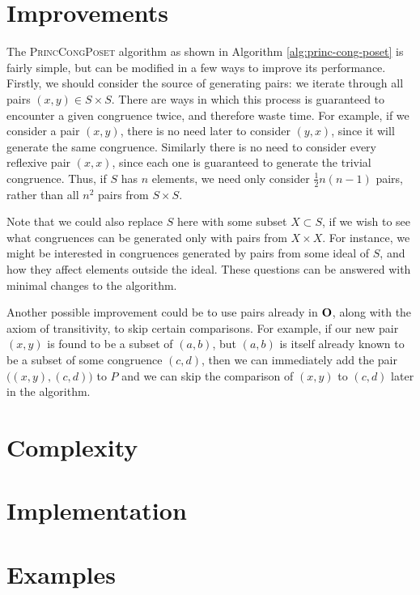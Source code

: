 \section{Improvements}
\label{sec:lattice-improvements}

The \textsc{PrincCongPoset} algorithm as shown in Algorithm
\ref{alg:princ-cong-poset} is fairly simple, but can be modified in a few ways
to improve its performance.  Firstly, we should consider the source of
generating pairs: we iterate through all pairs $(x,y) \in S \times S$.  There
are ways in which this process is guaranteed to encounter a given congruence
twice, and therefore waste time.  For example, if we consider a pair $(x,y)$,
there is no need later to consider $(y,x)$, since it will generate the same
congruence.  Similarly there is no need to consider every reflexive pair
$(x,x)$, since each one is guaranteed to generate the trivial congruence.  Thus,
if $S$ has $n$ elements, we need only consider $\frac{1}{2}n(n-1)$ pairs, rather
than all $n^2$ pairs from $S \times S$.

Note that we could also replace $S$ here with some subset $X \subset S$, if we
wish to see what congruences can be generated only with pairs from $X \times X$.
For instance, we might be interested in congruences generated by pairs from some
ideal of $S$, and how they affect elements outside the ideal.  These questions
can be answered with minimal changes to the algorithm.

Another possible improvement could be to use pairs already in $\mathbf{O}$, along with
the axiom of transitivity, to skip certain comparisons.  For example, if our new
pair $(x,y)$ is found to be a subset of $(a,b)$, but $(a,b)$ is itself already
known to be a subset of some congruence $(c,d)$, then we can immediately add the
pair $\big((x,y), (c,d)\big)$ to $P$ and we can skip the comparison of $(x,y)$
to $(c,d)$ later in the algorithm.

\section{Complexity}
\label{sec:lattice-complexity}

\section{Implementation}
\label{sec:lattice-implementation}

\section{Examples}
\label{sec:lattice-examples}
